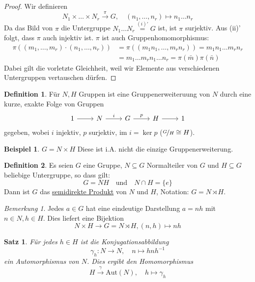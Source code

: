 \documentclass[12pt]{scrartcl}%
\newtheorem{thm}{Satz}
\theoremstyle{definition}
\newtheorem*{defn}{Definition}
\newtheorem{ex}{Beispiel}
\theoremstyle{remark}
\newtheorem*{nb}{Bemerkung}
\newcommand{\Inv}[1]{#1^{-1}}
\begin{document}
\begin{proof}
    Wir definieren $$N_1\times\dots\times N_r \overset{\pi}{\longrightarrow} G,\quad (n_1,\dots,n_r)\mapsto n_1\dots n_r$$
    Da das Bild von $\pi$ die Untergruppe $N_1\dots N_r \overset{(i)'}{=} G$ ist, ist $\pi$ surjektiv.
    Aus (ii)' folgt, dass $\pi$ auch injektiv ist.
    $\pi$ ist auch Gruppenhomomorphismus:
    \begin{align*}
		\pi((m_1,\dots,m_r)\cdot (n_1,\dots,n_r)) &= \pi((m_1n_1,\dots,m_rn_r)) = m_1n_1\dots m_rn_r\\
		&= m_1\dots m_rn_1\dots n_r = \pi(\bar m)\pi(\bar n)
    \end{align*}
    Dabei gilt die vorletzte Gleichheit, weil wir Elemente aus verschiedenen Untergruppen vertauschen dürfen.
\end{proof}

\begin{defn}
    Für $N,H$ Gruppen ist eine Gruppenerweiteruung von $N$ durch eine kurze, exakte Folge von Gruppen
    \[ \begin{tikzcd}
        1 \arrow[r] & N \arrow[r, "i"] & G \arrow[r, "p"] & H \arrow[r] & 1
    \end{tikzcd} \]
    gegeben, wobei $i$ injektiv, $p$ surjektiv, $\text{im } i = \ker p$ ($\nicefrac{G}{H} \cong H$). %
\end{defn}

\begin{ex}
    $G=N\times H$ Diese ist i.A. nicht die einzige Gruppenerweiterung.
\end{ex}

\begin{defn}
    Es seien $G$ eine Gruppe, $N\subseteq G$ Normalteiler von $G$ und $H\subseteq G$ beliebige Untergruppe, so dass gilt: $$G=NH \quad \text{und} \quad N\cap H = \{e\}$$ Dann ist $G$ das \underline{semidirekte Produkt} von $N$ und $H$, Notation: $G=N\rtimes H$.
\end{defn}

\begin{nb}
    Jedes $a\in G$ hat eine eindeutige Darstellung $a=nh$ mit $n\in N, h\in H$. Dies liefert eine Bijektion $$N\times H \to G=N\rtimes H, (n,h)\mapsto nh$$
\end{nb}

\begin{thm}
    Für jedes $h\in H$ ist die Konjugationsabbildung $$\gamma_h: N\to N, \quad n\mapsto hn\Inv{h}$$ ein Automorphismus von $N$.
    Dies ergibt den Homomorphismus $$H\overset{\gamma}{\longrightarrow} \text{Aut}(N), \quad h\mapsto \gamma_h$$
\end{thm}
\end{document}
